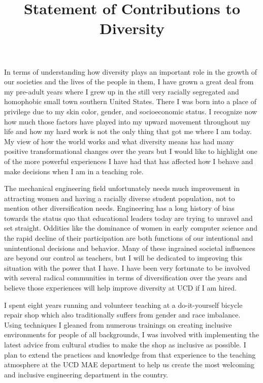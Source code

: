 \documentclass[titlepage]{article}
\title{Statement of Contributions to Diversity}
\date{}
\begin{document}
\maketitle

In terms of understanding how diversity plays an important role in the growth
of our societies and the lives of the people in them, I have grown a great deal
from my pre-adult years where I grew up in the still very racially segregated
and homophobic small town southern United States. There I was born into a place
of privilege due to my skin color, gender, and socioeconomic status. I
recognize now how much those factors have played into my upward movement
throughout my life and how my hard work is not the only thing that got me where
I am today. My view of how the world works and what diversity means has had
many positive transformational changes over the years but I would like to
highlight one of the more powerful experiences I have had that has affected how
I behave and make decisions when I am in a teaching role.

The mechanical engineering field unfortunately needs much improvement in
attracting women and having a racially diverse student population, not to
mention other diversification needs. Engineering has a long history of bias
towards the status quo that educational leaders today are trying to unravel and
set straight. Oddities like the dominance of women in early computer science
and the rapid decline of their participation are both functions of our
intentional and unintentional decisions and behavior. Many of these ingrained
societal influences are beyond our control as teachers, but I will be dedicated
to improving this situation with the power that I have. I have been very
fortunate to be involved with several radical communities in terms of
diversification over the years and believe those experiences will help improve
diversity at UCD if I am hired.

I spent eight years running and volunteer teaching at a do-it-yourself bicycle
repair shop which also traditionally suffers from gender and race imbalance.
Using techniques I gleaned from numerous trainings on creating inclusive
environments for people of all backgrounds, I was involved with
implementing the latest advice from cultural studies to make the shop as
inclusive as possible. I plan to extend the practices and knowledge from that
experience to the teaching atmosphere at the UCD MAE department to help us
create the most welcoming and inclusive engineering department in the country.
\end{document}
